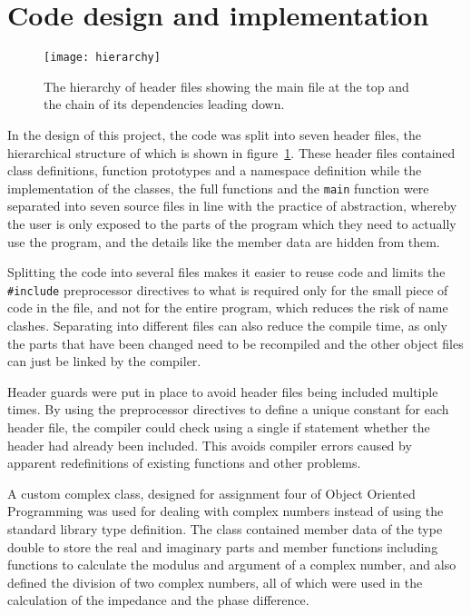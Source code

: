 \section{Code design and implementation}
\label{sec:code}
\begin{figure}
  \begin{center}
    \texttt{[image: hierarchy]}
  \end{center}
  \caption{The hierarchy of header files showing the main file at the top and the chain of its dependencies leading down.}
  \label{fig:hierarchy}
\end{figure}
In the design of this project, the code was split into seven header files, the hierarchical structure of which is shown in figure~\ref{fig:hierarchy}. These header files contained class definitions, function prototypes and a namespace definition while the implementation of the classes, the full functions and the \verb!main! function were separated into seven source files in line with the practice of abstraction, whereby the user is only exposed to the parts of the program which they need to actually use the program, and the details like the member data are hidden from them.

Splitting the code into several files makes it easier to reuse code and limits the \verb!#include! preprocessor directives to what is required only for the small piece of code in the file, and not for the entire program, which reduces the risk of name clashes. Separating into different files can also reduce the compile time, as only the parts that have been changed need to be recompiled and the other object files can just be linked by the compiler.

Header guards were put in place to avoid header files being included multiple times. By using the preprocessor directives to define a unique constant for each header file, the compiler could check using a single if statement whether the header had already been included. This avoids compiler errors caused by apparent redefinitions of existing functions and other problems.

A custom complex class, designed for assignment four of Object Oriented Programming was used for dealing with complex numbers instead of using the standard library type definition. The class contained member data of the type double to store the real and imaginary parts and member functions including functions to calculate the modulus and argument of a complex number, and also defined the division of two complex numbers, all of which were used in the calculation of the impedance and the phase difference.


